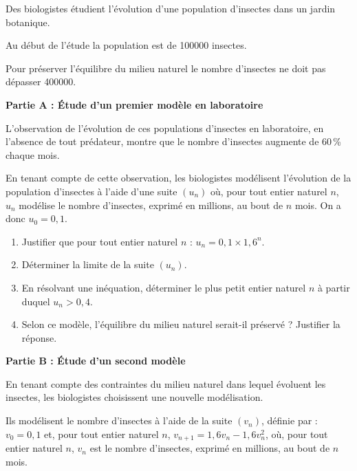 Des biologistes étudient l’évolution d’une population d’insectes dans un jardin botanique.

Au début de l’étude la population est de \num{100000} insectes.

Pour préserver l’équilibre du milieu naturel le nombre d’insectes ne doit pas dépasser \num{400000}.

\bigskip

\textbf{Partie A : Étude d’un premier modèle en laboratoire}

\medskip

L’observation de l’évolution de ces populations d’insectes en laboratoire, en l’absence de tout prédateur, montre que le nombre d’insectes augmente de $60$\,\% chaque mois.

En tenant compte de cette observation, les biologistes modélisent l’évolution de la population d’insectes à l’aide d’une suite $\left(u_n\right)$ où, pour tout entier naturel $n$, $u_n$ modélise le nombre d’insectes, exprimé en millions, au bout de $n$ mois. On a donc $u_0 = 0,1$.

\begin{enumerate}
	\item Justifier que pour tout entier naturel $n$ : $u_n = 0,1 \times 1,6^n$.
	\item Déterminer la limite de la suite $\left(u_n\right)$.
	\item En résolvant une inéquation, déterminer le plus petit entier naturel $n$ à partir duquel $u_n > 0,4$.
	\item Selon ce modèle, l’équilibre du milieu naturel serait-il préservé ? Justifier la réponse.
\end{enumerate}

\smallskip

\textbf{Partie B : Étude d’un second modèle}

\medskip

En tenant compte des contraintes du milieu naturel dans lequel évoluent les insectes, les biologistes choisissent une nouvelle modélisation.

Ils modélisent le nombre d’insectes à l’aide de la suite $\left(v_n\right)$, définie par : $v_0=0,1$ et, pour tout 
entier naturel $n$, $v_{n+1}=1,6v_n-1,6v_n^2$, où, pour tout entier naturel $n$, $v_n$ est le nombre d’insectes, exprimé en millions, au bout de $n$ mois.

